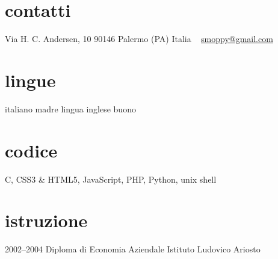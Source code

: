 \documentclass[]{friggeri-cv} %
\begin{document}


\begin{aside} %
\section{contatti}
Via H. C. Andersen, 10
90146 Palermo (PA)
Italia
~
\href{mailto:smoppy@gmail.com}{smoppy@gmail.com}
\section{lingue}
italiano madre lingua
inglese buono
\section{codice}
C, CSS3 \& HTML5,
JavaScript, PHP, Python, unix shell
\end{aside}

\section{istruzione}
\begin{entrylist}
\entry
{2002--2004}
{Diploma {\normalfont di Economia Aziendale}}
{Istituto Ludovico Ariosto}
{}
\end{entrylist}

\end{document}
